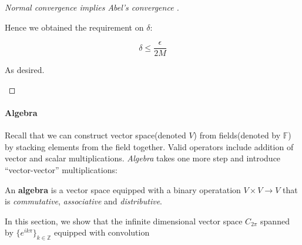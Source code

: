 \begin{proof}[Normal convergence implies Abel's convergence ]
\begin{enumerate}
Hence we obtained the requirement on $\delta$:

\begin{equation}
\delta \leq \frac{\epsilon}{2M}
\end{equation}


As desired.
\end{enumerate}

\end{proof}\paragraph{Algebra}

Recall that we can construct vector space(denoted $V$) from fields(denoted by $\mathbb{F}$) by stacking elements from the field together. Valid operators include addition of vector and scalar multiplications. \textit{Algebra} takes one more step and introduce ``vector-vector'' multiplications:

\begin{definition}[Algebra]An \textbf{algebra} is a vector space equipped with a binary operatation $V\times V\to V$ that is \textit{commutative}, \textit{associative} and \textit{distributive}.

\end{definition}In this section, we show that the infinite dimensional vector space $C_{2\pi}$ spanned by $\{e^{ik\pi}\}_{k\in\mathbb{Z}}$ equipped with convolution